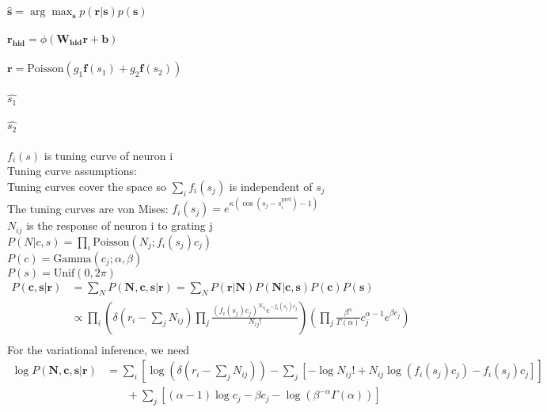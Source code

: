 \documentclass[12pt]{article}
\begin{document}
$\hat{\mathbf{s}} = \arg\max_\mathbf{s} p(\mathbf{r|s}) p(\mathbf{s})$
\\
\\
$\mathbf{r_\text{hid}} = \phi (\mathbf{W_{\text{hid}}r + b})$
\\
\\
$\mathbf{r} = \text{Poisson} (g_1\mathbf{f} (s_1) + g_2\mathbf{f} (s_2))$
\\
\\
$\hat{s_1}$
\\
\\
$\hat{s_2}$
\\
\\
$f_i(s)$ is tuning curve of neuron i\\
Tuning curve assumptions:\\
Tuning curves cover the space so $\sum_i f_i(s_j)$ is independent of $s_j$\\
The tuning curves are von Mises: $f_i(s_j) = e^{\kappa(\cos(s_j - s_i^{\text{pref}}) - 1)}$\\
$N_{ij}$ is the response of neuron i to grating j\\
$P(N|c, s) = \prod_i \text{Poisson}(N_{j}; f_i(s_j)c_j)$\\
$P(c) = \text{Gamma}(c_j; \alpha, \beta)$\\
$P(s) = \text{Unif}(0, 2\pi)$\\
\begin{equation}
\begin{aligned}
P(\mathbf{c, s|r}) & = \sum_N P(\mathbf{N, c, s|r}) = \sum_N P(\mathbf{r|N}) P(\mathbf{N|c, s}) P(\mathbf{c}) P(\mathbf{s})\\
&\propto \prod_i (\delta(r_i - \sum_j N_{ij}) \prod_j\frac{(f_i(s_j)c_j)^{N_{ij}} e^{-f_i(s_j) c_j}}{N_{ij}!}) (\prod_j \frac{\beta^{\alpha}}{\Gamma(\alpha)} c_j^{\alpha - 1}e^{\beta c_j})\\
\end{aligned}
\end{equation}
For the variational inference, we need\\
\begin{equation}
\begin{aligned}
\log P(\mathbf{N, c, s| r}) &= \sum_i [\log(\delta(r_i - \sum_j N_{ij})) - \sum_j [- \log N_{ij}! + N_{ij} \log(f_i(s_j)c_j) - f_i(s_j) c_j]]\\
& \phantom{{}=1} + \sum_j[(\alpha - 1) \log c_j - \beta c_j - \log (\beta^{- \alpha} \Gamma (\alpha))]\\
\end{aligned}
\end{equation}
\end{document}
